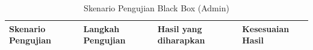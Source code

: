 \begin{longtable}{|p{3.8cm}|p{4.5cm}|p{4.5cm}|p{2cm}|} %
    \caption{Skenario Pengujian Black Box (Admin)} \label{tabel:rancangan_bb_admin}                                                                                                                                                                                                                                                                                                                                                                                                             \\
    \hline
    \textbf{Skenario Pengujian}                                     & \textbf{Langkah Pengujian}                                                                                                                                                                                                                          & \textbf{Hasil yang diharapkan}                                                                                                          & \textbf{Kesesuaian Hasil} \\
    \hline
    \endfirsthead




\end{longtable}
